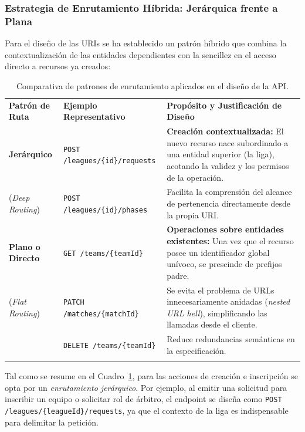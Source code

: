 \subsubsection{Estrategia de Enrutamiento Híbrida: Jerárquica frente a Plana}
Para el diseño de las URIs se ha establecido un patrón híbrido que combina la contextualización de las entidades dependientes con la sencillez en el acceso directo a recursos ya creados:

\begin{table}[htbp]
    \centering
    \renewcommand{\arraystretch}{1.25}
    \begin{tabularx}{\textwidth}{>{\RaggedRight\arraybackslash}p{2.8cm} >{\RaggedRight\arraybackslash}p{3.8cm} >{\RaggedRight\arraybackslash}X}
        \textbf{Patrón de Ruta} & \textbf{Ejemplo Representativo} & \textbf{Propósito y Justificación de Diseño} \\ \lightrule
        \textbf{Jerárquico} & \texttt{POST /leagues/\{id\}/requests} & \textbf{Creación contextualizada:} El nuevo recurso nace subordinado a una entidad superior (la liga), acotando la validez y los permisos de la operación. \\ \lightrule
        (\textit{Deep Routing}) & \texttt{POST /leagues/\{id\}/phases} & Facilita la comprensión del alcance de pertenencia directamente desde la propia URI. \\ \lightrule
        \textbf{Plano o Directo} & \texttt{GET /teams/\{teamId\}} & \textbf{Operaciones sobre entidades existentes:} Una vez que el recurso posee un identificador global unívoco, se prescinde de prefijos padre. \\ \lightrule
        (\textit{Flat Routing}) & \texttt{PATCH /matches/\{matchId\}} & Se evita el problema de URLs innecesariamente anidadas (\textit{nested URL hell}), simplificando las llamadas desde el cliente. \\ \lightrule
        & \texttt{DELETE /teams/\{teamId\}} & Reduce redundancias semánticas en la especificación. \\ \lightrule
    \end{tabularx}
    \caption{Comparativa de patrones de enrutamiento aplicados en el diseño de la API.}
    \label{tab:api_routing_patterns}
\end{table}

Tal como se resume en el Cuadro~\ref{tab:api_routing_patterns}, para las acciones de creación e inscripción se opta por un \textit{enrutamiento jerárquico}. Por ejemplo, al emitir una solicitud para inscribir un equipo o solicitar rol de árbitro, el endpoint se diseña como \texttt{POST /leagues/\{leagueId\}/requests}, ya que el contexto de la liga es indispensable para delimitar la petición.

